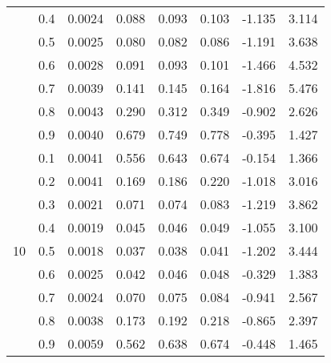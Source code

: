 \documentclass[11pt,a4paper]{report}
\begin{document}
\begin{longtable}{ | c | c || c | c | c | c | c | c | }
 & 0.4 & 0.0024 & 0.088 & 0.093 & 0.103 & -1.135 & 3.114 \\
 & 0.5 & 0.0025 & 0.080 & 0.082 & 0.086 & -1.191 & 3.638 \\
 & 0.6 & 0.0028 & 0.091 & 0.093 & 0.101 & -1.466 & 4.532 \\
 & 0.7 & 0.0039 & 0.141 & 0.145 & 0.164 & -1.816 & 5.476 \\
 & 0.8 & 0.0043 & 0.290 & 0.312 & 0.349 & -0.902 & 2.626 \\
 & 0.9 & 0.0040 & 0.679 & 0.749 & 0.778 & -0.395 & 1.427 \\
 \hline
\multirow{9}{*}{10} & 0.1 & 0.0041 & 0.556 & 0.643 & 0.674 & -0.154 & 1.366 \\
 & 0.2 & 0.0041 & 0.169 & 0.186 & 0.220 & -1.018 & 3.016 \\
 & 0.3 & 0.0021 & 0.071 & 0.074 & 0.083 & -1.219 & 3.862 \\
 & 0.4 & 0.0019 & 0.045 & 0.046 & 0.049 & -1.055 & 3.100 \\
 & 0.5 & 0.0018 & 0.037 & 0.038 & 0.041 & -1.202 & 3.444 \\
 & 0.6 & 0.0025 & 0.042 & 0.046 & 0.048 & -0.329 & 1.383 \\
 & 0.7 & 0.0024 & 0.070 & 0.075 & 0.084 & -0.941 & 2.567 \\
 & 0.8 & 0.0038 & 0.173 & 0.192 & 0.218 & -0.865 & 2.397 \\
 & 0.9 & 0.0059 & 0.562 & 0.638 & 0.674 & -0.448 & 1.465 \\
 \hline
\hline
\end{longtable}
\end{document}
